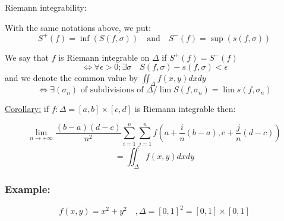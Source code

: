 \begin{definition}
  Riemann integrability:

  With the same notations above, we put:
  \[S^+(f)= \inf(S(f,\sigma)) \quad \text{and} \quad S^-(f)= \sup (s(f,\sigma))\]

We say that $f$ is Riemann integrable on $\Delta$ if $S^+(f) = S^-(f)$
\[\Leftrightarrow \forall \epsilon > 0; \exists \sigma \quad S(f, \sigma) - s(f, \sigma) < \epsilon\]
and we denote the common value by $\iint_{\Delta}f(x,y)dxdy$
\[\Leftrightarrow \exists(\sigma_n) \text{ of subdivisions of } \Delta / \lim S (f, \sigma_n) = \lim s(f, \sigma_n)\]

\underline{Corollary:} if  $f : \Delta = \left[a,b\right]\times\left[c,d\right]$ is Riemann integrable then:

\[\lim\limits_{n \to +\infty} \frac{(b-a)(d-c)}{n^2}\sum_{i=1}^n\sum_{j =1}^n f(a + \frac{i}{n}(b-a),c + \frac{j}{n}(d-c))\]
\[ = \iint_{\Delta}f(x,y)dxdy\]

\end{definition}

\subsubsection{Example:}
\[f(x,y) = x^2 + y^2 \quad,\Delta = \left[0,1\right]^2= \left[0,1\right]\times\left[0,1\right]\]


